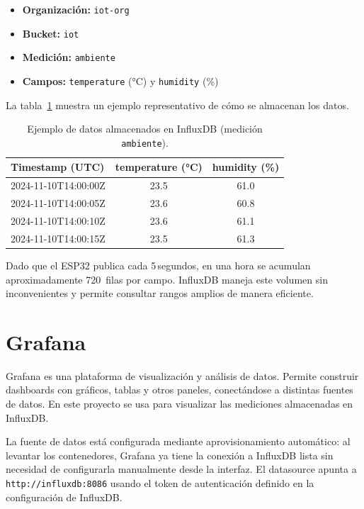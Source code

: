 \documentclass[12pt, a4paper]{article}
\begin{document}
\begin{itemize}
    \item \textbf{Organización:} \texttt{iot-org}
    \item \textbf{Bucket:} \texttt{iot}
    \item \textbf{Medición:} \texttt{ambiente}
    \item \textbf{Campos:} \texttt{temperature} (°C) y \texttt{humidity} (\%)
\end{itemize}

La tabla~\ref{tab:influx} muestra un ejemplo representativo de cómo se almacenan
los datos.

\begin{table}[H]
    \centering
    \caption{Ejemplo de datos almacenados en InfluxDB (medición \texttt{ambiente}).}
    \label{tab:influx}
    \begin{tabular}{@{}lcc@{}}
        \toprule
        \textbf{Timestamp (UTC)} & \textbf{temperature (°C)} & \textbf{humidity (\%)} \\
        \midrule
        2024-11-10T14:00:00Z & 23.5 & 61.0 \\
        2024-11-10T14:00:05Z & 23.6 & 60.8 \\
        2024-11-10T14:00:10Z & 23.6 & 61.1 \\
        2024-11-10T14:00:15Z & 23.5 & 61.3 \\
        \bottomrule
    \end{tabular}
\end{table}

Dado que el ESP32 publica cada 5\,segundos, en una hora se acumulan aproximadamente
720~filas por campo. InfluxDB maneja este volumen sin inconvenientes y permite
consultar rangos amplios de manera eficiente.

\section{Grafana}

Grafana es una plataforma de visualización y análisis de datos. Permite construir
dashboards con gráficos, tablas y otros paneles, conectándose a distintas fuentes de
datos. En este proyecto se usa para visualizar las mediciones almacenadas en InfluxDB.

La fuente de datos está configurada mediante aprovisionamiento automático: al
levantar los contenedores, Grafana ya tiene la conexión a InfluxDB lista sin
necesidad de configurarla manualmente desde la interfaz. El datasource apunta a
\texttt{http://influxdb:8086} usando el token de autenticación definido en la
configuración de InfluxDB.
\end{document}
